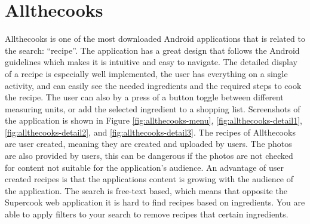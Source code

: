 \section{Allthecooks}
Allthecooks is one of the most downloaded \cite{allthecooks-googleplay} Android applications that is related to the search: ``recipe''. The application has a great design that follows the Android guidelines\cite{guidelines-appstructure} which makes it is intuitive and easy to navigate. The detailed display of a recipe is especially well implemented, the user has everything on a single activity, and can easily see the needed ingredients and the required steps to cook the recipe. The user can also by a press of a button toggle between different measuring units, or add the selected ingredient to a shopping list. Screenshots of the application is shown in Figure \ref{fig:allthecooks-menu}, \ref{fig:allthecooks-detail1}, \ref{fig:allthecooks-detail2}, and \ref{fig:allthecooks-detail3}.
The recipes of Allthecooks are user created, meaning they are created and uploaded by users. The photos are also provided by users, this can be dangerous if the photos are not checked for content not suitable for the application's audience. An advantage of user created recipes is that the applications content is growing with the audience of the application.
The search is free-text based, which means that opposite the Supercook web application it is hard to find recipes based on ingredients. You are able to apply filters to your search to remove recipes that certain ingredients.

